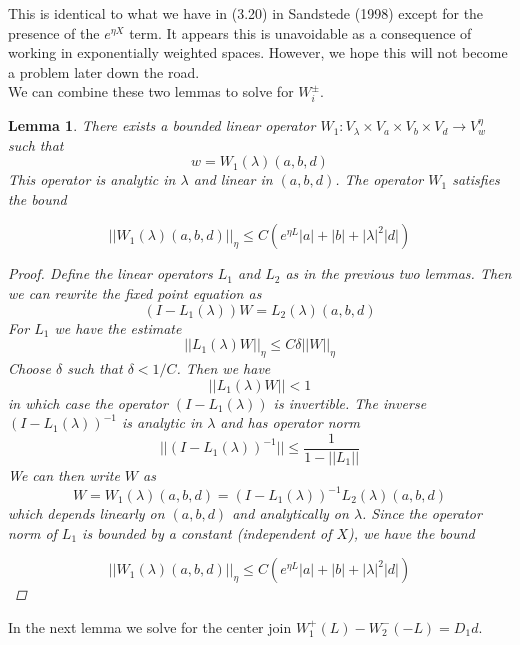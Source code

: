 \documentclass[12pt]{article}
\newtheorem{lemma}{Lemma}
\begin{document}
This is identical to what we have in (3.20) in Sandstede (1998) except for the presence of the $e^{\eta X}$ term. It appears this is unavoidable as a consequence of working in exponentially weighted spaces. However, we hope this will not become a problem later down the road.\\

We can combine these two lemmas to solve for $W_i^\pm$.

\begin{lemma}\label{W1}
There exists a bounded linear operator $W_1: V_\lambda \times V_a \times V_b \times V_d \rightarrow V_w^\eta$ such that 
\[
w = W_1(\lambda)(a,b,d)
\]
This operator is analytic in $\lambda$ and linear in $(a, b, d)$. The operator $W_1$ satisfies the bound

\[
||W_1(\lambda)(a,b,d)||_\eta \leq C ( e^{\eta L}|a| + |b| + |\lambda|^2 |d|)
\]

\begin{proof}
Define the linear operators $L_1$ and $L_2$ as in the previous two lemmas. Then we can rewrite the fixed point equation as
\[
(I - L_1(\lambda))W = L_2(\lambda)(a,b,d)
\]
For $L_1$ we have the estimate
\[
||L_1(\lambda)W||_\eta \leq C \delta ||W||_\eta
\]
Choose $\delta$ such that $\delta < 1/C$. Then we have
\[
||L_1(\lambda)W|| < 1
\]
in which case the operator $(I - L_1(\lambda))$ is invertible. The inverse $(I - L_1(\lambda))^{-1}$ is analytic in $\lambda$ and has operator norm 
\[
||(I - L_1(\lambda))^{-1}|| \leq \frac{1}{1 - ||L_1||}
\]
We can then write $W$ as
\[
W = W_1(\lambda)(a,b,d) = (I - L_1(\lambda))^{-1} L_2(\lambda)(a,b,d)
\]
which depends linearly on $(a,b,d)$ and analytically on $\lambda$. Since the operator norm of $L_1$ is bounded by a constant (independent of $X$), we have the bound

\[
||W_1(\lambda)(a,b,d)||_\eta \leq C ( e^{\eta L}|a| + |b| + |\lambda|^2 |d|)
\]

\end{proof}

\end{lemma}

In the next lemma we solve for the center join $W_1^+(L) - W_2^-(-L) = D_1 d$.
\end{document}
